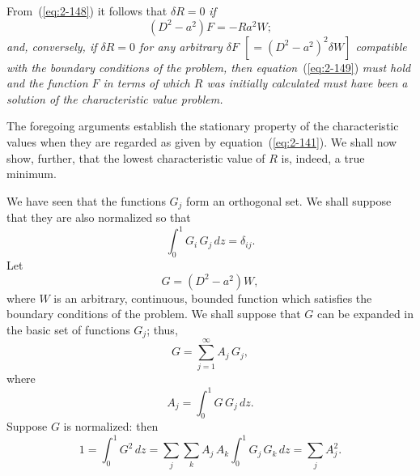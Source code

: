 From~(\ref{eq:2-148}) it follows that $\delta R = 0$ \emph{if}
\begin{equation}
\label{eq:2-149}
(D^2-a^2)F = -Ra^2 W;
\end{equation}
\emph{and, conversely, if $\delta R = 0$ for any arbitrary $\delta F$ $[= (D^2-a^2)^2\delta W]$ compatible
with the boundary conditions of the problem, then equation}~(\ref{eq:2-149}) \emph{must hold
and the function $F$ in terms of which $R$ was initially calculated must have
been a solution of the characteristic value problem.}

The foregoing arguments establish the stationary property of the
characteristic values when they are regarded as given by equation~(\ref{eq:2-141}).
We shall now show, further, that the lowest characteristic value of $R$
is, indeed, a true minimum.

We have seen that the functions $G_j$ form an orthogonal set. We shall
suppose that they are also normalized so that
\begin{equation}
\label{eq:2-150}
\int_0^1 G_i\,G_j\,dz = \delta_{ij}.
\end{equation}
Let
\begin{equation}
\label{eq:2-151}
G = (D^2-a^2)W,
\end{equation}
where $W$ is an arbitrary, continuous, bounded function which satisfies
the boundary conditions of the problem. We shall suppose that $G$ can
be expanded in the basic set of functions $G_j$; thus,
\begin{equation}
\label{eq:2-152}
G = \sum_{j=1}^{\infty} A_j\,G_j,
\end{equation}
where
\begin{equation}
\label{eq:2-153}
A_j = \int_0^1 G\,G_j\,dz.
\end{equation}
Suppose $G$ is normalized: then
\begin{equation}
\label{eq:2-154}
1 = \int_0^1 G^2\,dz = \sum_j\sum_k A_j\,A_k\!\int_0^1 G_j\,G_k\,dz = \sum_j A_j^2.
\end{equation}

